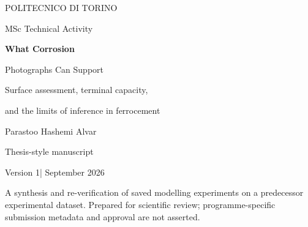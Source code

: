 \documentclass[11pt,a4paper,oneside]{report}
\newcommand{\shared}{..}
\newcommand{\draftversion}{Version 1}
\begin{document}
\hypersetup{pageanchor=false}
\begin{titlepage}
\centering
{\large POLITECNICO DI TORINO\par}\vspace{24mm}
{\large MSc Technical Activity\par}\vspace{8mm}
{\Huge\bfseries What Corrosion\par Photographs Can Support\par}\vspace{9mm}
{\Large Surface assessment, terminal capacity,\par and the limits of inference in ferrocement\par}\vspace{21mm}
{\Large Parastoo Hashemi Alvar\par}\vfill
{\large Thesis-style manuscript\par}\vspace{3mm}
{\draftversion\quad | September 2026\par}\vspace{8mm}
\begin{minipage}{.8\textwidth}\small\centering
A synthesis and re-verification of saved modelling experiments on a predecessor experimental dataset. Prepared for scientific review; programme-specific submission metadata and approval are not asserted.
\end{minipage}
\end{titlepage}
\hypersetup{pageanchor=true}

\tableofcontents\listoffigures\listoftables
\clearpage{}










\appendix



\end{document}
